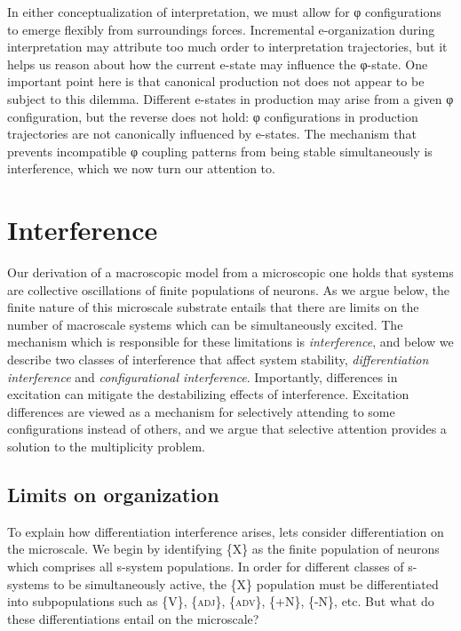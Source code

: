   In either conceptualization of interpretation, we must allow for φ configurations to emerge flexibly from surroundings forces. Incremental e-organization during interpretation may attribute too much order to interpretation trajectories, but it helps us reason about how the current e-state may influence the φ-state. One important point here is that canonical production not does not appear to be subject to this dilemma. Different e-states in production may arise from a given φ configuration, but the reverse does not hold: φ configurations in production trajectories are not canonically influenced by e-states. The mechanism that prevents incompatible φ coupling patterns from being stable simultaneously is interference, which we now turn our attention to.

\section{Interference}

Our derivation of a macroscopic model from a microscopic one holds that systems are collective oscillations of finite populations of neurons. As we argue below, the finite nature of this microscale substrate entails that there are limits on the number of macroscale systems which can be simultaneously excited. The mechanism which is responsible for these limitations is \textit{interference}, and below we describe two classes of interference that affect system stability, \textit{differentiation interference} and \textit{configurational interference}. Importantly, differences in excitation can mitigate the destabilizing effects of interference. Excitation differences are viewed as a mechanism for selectively attending to some configurations instead of others, and we argue that selective attention provides a solution to the multiplicity problem.

\subsection{Limits on organization}

To explain how differentiation interference arises, lets consider differentiation on the microscale. We begin by identifying \{X\} as the finite population of neurons which comprises all s-system populations. In order for different classes of s-systems to be simultaneously active, the \{X\} population must be differentiated into subpopulations such as \{V\}, \{\textsc{adj}\}, \{\textsc{adv}\}, \{+N\}, \{-N\}, etc. But what do these differentiations entail on the microscale?


